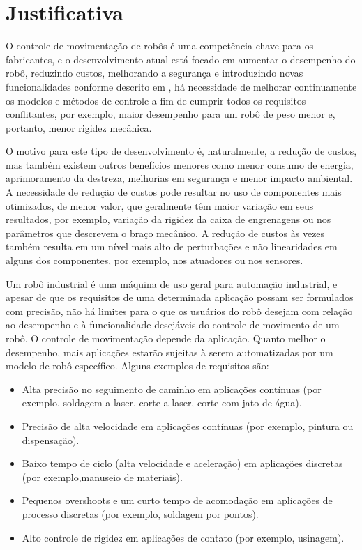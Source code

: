  
\section{Justificativa}

O controle de movimentação de robôs é uma competência chave para os fabricantes, e o desenvolvimento atual está focado em aumentar o desempenho do robô, reduzindo custos, melhorando a segurança e introduzindo novas funcionalidades conforme descrito
em \cite{brogaardh2007present}, há necessidade de melhorar continuamente os modelos e métodos 
de controle a fim de cumprir todos os requisitos conflitantes, por exemplo,
maior desempenho para um robô de peso menor e, portanto, menor rigidez mecânica.

O motivo para este tipo de desenvolvimento é, naturalmente, a redução de custos, mas também existem outros benefícios menores como menor consumo de energia, aprimoramento da destreza, melhorias em segurança
e menor impacto ambiental. A necessidade de redução de custos pode resultar no uso
de componentes mais otimizados, de menor valor, que geralmente têm maior variação em seus resultados,
por exemplo, variação da rigidez da caixa de engrenagens ou nos parâmetros que descrevem o
braço mecânico. A redução de custos às vezes também resulta em um nível mais alto de perturbações e
não linearidades em alguns dos componentes, por exemplo, nos atuadores ou nos sensores.

Um robô industrial é uma máquina de uso geral para automação industrial, e apesar de que os requisitos de uma determinada aplicação possam ser formulados com precisão, não há limites para o que os usuários do robô desejam com relação ao desempenho e à funcionalidade desejáveis do controle de movimento de um robô. O controle de movimentação depende da aplicação. Quanto melhor o desempenho,
mais aplicações estarão sujeitas à serem automatizadas por um modelo de robô específico.
Alguns exemplos de requisitos são:

\begin{itemize}
   \item Alta precisão no seguimento de caminho em aplicações contínuas (por exemplo, soldagem a laser, corte a laser, corte com jato de água).
   \item Precisão de alta velocidade em aplicações contínuas (por exemplo, pintura ou dispensação).
   \item Baixo tempo de ciclo (alta velocidade e aceleração) em aplicações discretas (por exemplo,manuseio de materiais).
   \item Pequenos overshoots e um curto tempo de acomodação em aplicações de processo discretas
(por exemplo, soldagem por pontos).
   \item Alto controle de rigidez em aplicações de contato (por exemplo, usinagem).
 \end{itemize}

